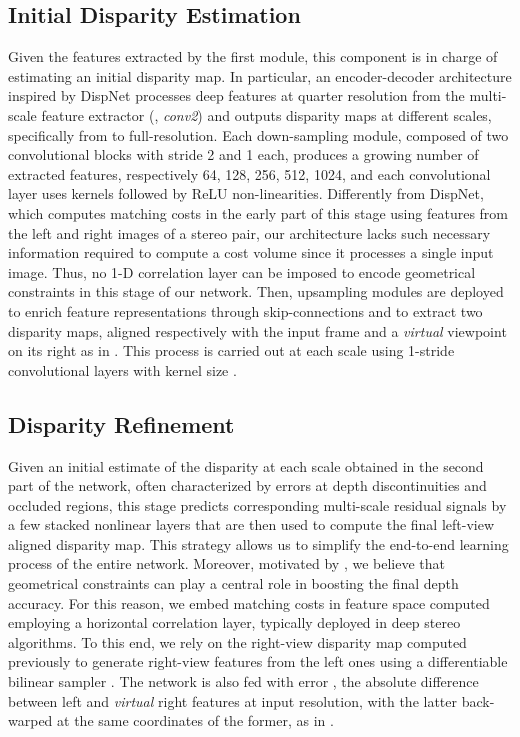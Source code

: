 \documentclass[10pt,twocolumn,letterpaper]{article}
\begin{document}
\subsection{Initial Disparity Estimation}

Given the features extracted by the first module, this component is in charge of estimating an initial disparity map. In particular, an encoder-decoder architecture inspired by DispNet processes deep features at quarter resolution from the multi-scale feature extractor (\ie, \textit{conv2}) and outputs disparity maps at different scales, specifically from  to full-resolution. Each down-sampling module, composed of two convolutional blocks with stride 2 and 1 each, produces a growing number of extracted features, respectively 64, 128, 256, 512, 1024, and each convolutional layer uses  kernels followed by ReLU non-linearities. Differently from DispNet, which computes matching costs in the early part of this stage using features from the left and right images of a stereo pair, our architecture lacks such necessary information required to compute a cost volume since it processes a single input image.  Thus, no 1-D correlation layer can be imposed to encode geometrical constraints in this stage of our network. Then, upsampling modules are deployed to enrich feature representations through skip-connections and to extract two disparity maps, aligned respectively with the input frame and a \emph{virtual} viewpoint on its right as in \cite{monodepth17}. This process is carried out at each scale using 1-stride convolutional layers with kernel size .    



\subsection{Disparity Refinement}
\label{sec:refinement}

Given an initial estimate of the disparity at each scale obtained in the second part of the network, often characterized by errors at depth discontinuities and occluded regions, this stage predicts corresponding multi-scale residual signals \cite{he2016deep} by a few stacked nonlinear layers that are then used to compute the final left-view aligned disparity map. This strategy allows us to simplify the end-to-end learning process of the entire network. Moreover, motivated by \cite{luo2018single}, we believe that geometrical constraints can play a central role in boosting the final depth accuracy. For this reason, we embed matching costs in feature space computed employing a horizontal correlation layer, typically deployed in deep stereo algorithms. To this end, we rely on the right-view disparity map computed previously to generate right-view features  from the left ones  using a differentiable bilinear sampler \cite{jaderberg2015spatial}. 
The network is also fed with error , \ie the absolute difference between left and \textit{virtual} right features at input resolution, with the latter back-warped at the same coordinates of the former, as in \cite{liang2018learning}.
\end{document}
